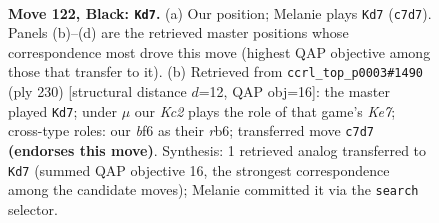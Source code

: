 \documentclass[11pt]{article}
\begin{document}
\begin{figure}[p]\centering
\begin{subfigure}{0.46\textwidth}\centering
\resizebox{\linewidth}{!}{%
\newchessgame
\chessboard[
  setfen={8/2k5/5B2/5q2/KN6/8/8/8 b - - 13 122},
  showmover=false,
  pgfstyle=straightmove, color=movearrow, markmove={c7-d7}
]}
\caption{}
\end{subfigure}\hfill
\begin{subfigure}{0.46\textwidth}\centering
\resizebox{\linewidth}{!}{%
\newchessgame
\chessboard[
  setfen={8/4K3/1r6/k7/3Q4/8/8/8 w - - 7 116},
  showmover=false,
  pgfstyle=straightmove, color=movearrow, markmove={e7-d7}
]}
\caption{}
\end{subfigure}
\\[4pt]

\caption{\textbf{Move 122, Black: \texttt{Kd7}.} (a) Our position; Melanie plays \texttt{Kd7} (\texttt{c7d7}). Panels (b)--(d) are the retrieved master positions whose correspondence most drove this move (highest QAP objective among those that transfer to it). (b) Retrieved from \texttt{ccrl\_top\_p0003\#1490} (ply 230) [structural distance $d$=12, QAP obj=16]: the master played \texttt{Kd7}; under $\mu$ our \emph{Kc2} plays the role of that game's \emph{Ke7}; cross-type roles: our \emph{b}f6 as their \emph{r}b6; transferred move \texttt{c7d7} \textbf{(endorses this move)}. Synthesis: 1 retrieved analog transferred to \texttt{Kd7} (summed QAP objective 16, the strongest correspondence among the candidate moves); Melanie committed it via the \texttt{search} selector.}
\label{fig:thought-m243}
\end{figure}

\clearpage
\end{document}
